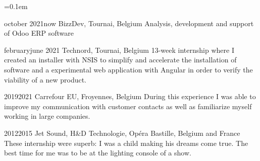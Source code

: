 \begin{indentsection}{\parindent}
  \parskip=0.1em
  \item[]
  {october 2021}{now}
  {BizzDev, Tournai, Belgium}
  {Analysis, development and support of Odoo ERP software}

  {february}{june 2021}
  {Technord, Tournai, Belgium}
  {13-week internship where I created an installer with NSIS to simplify and accelerate the installation of software and a experimental web application with Angular in order to verify the viability of a new product.}

  \item[]
  {2019}{2021}
  {Carrefour EU, Froyennes, Belgium}
  {During this experience I was able to improve my communication with customer contacts as well as familiarize myself working in large companies.}

  \item[]
  {2012}{2015}
  {Jet Sound, H\&D Technologie, Opéra Bastille, Belgium and France}
  {These internship were superb: I was a child making his dreams come true. The best time for me was to be at the lighting console of a show.}
\end{indentsection}
